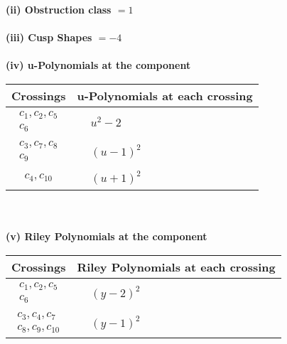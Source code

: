 \documentclass[1p]{elsarticle_modified}
\theoremstyle{definition}
\begin{document}
\flushleft \textbf{(ii) Obstruction class $= 1$}\\~\\
\flushleft \textbf{(iii) Cusp Shapes $= -4$}\\~\\
\newpage\renewcommand{\arraystretch}{1}
\flushleft \textbf{(iv) u-Polynomials at the component}\newline \\
\begin{tabular}{m{50pt}|m{274pt}}
Crossings & \hspace{64pt}u-Polynomials at each crossing \\
\hline $$\begin{aligned}c_{1},c_{2},c_{5}\\c_{6}\end{aligned}$$&$\begin{aligned}
&u^2-2
\end{aligned}$\\
\hline $$\begin{aligned}c_{3},c_{7},c_{8}\\c_{9}\end{aligned}$$&$\begin{aligned}
&(u-1)^2
\end{aligned}$\\
\hline $$\begin{aligned}c_{4},c_{10}\end{aligned}$$&$\begin{aligned}
&(u+1)^2
\end{aligned}$\\
\hline
\end{tabular}\\~\\
\newpage\renewcommand{\arraystretch}{1}
\flushleft \textbf{(v) Riley Polynomials at the component}\newline \\
\begin{tabular}{m{50pt}|m{274pt}}
Crossings & \hspace{64pt}Riley Polynomials at each crossing \\
\hline $$\begin{aligned}c_{1},c_{2},c_{5}\\c_{6}\end{aligned}$$&$\begin{aligned}
&(y-2)^2
\end{aligned}$\\
\hline $$\begin{aligned}c_{3},c_{4},c_{7}\\c_{8},c_{9},c_{10}\end{aligned}$$&$\begin{aligned}
&(y-1)^2
\end{aligned}$\\
\hline
\end{tabular}\\~\\
\end{document}
